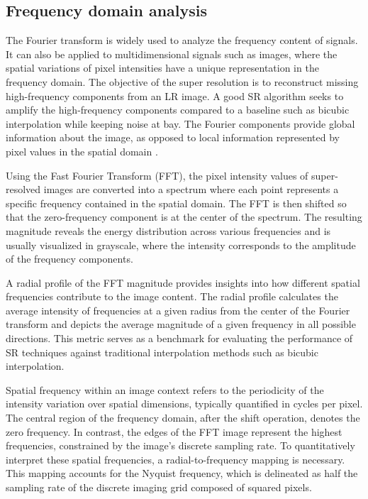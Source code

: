         \subsection{Frequency domain analysis} \label{subsubsec:frequency_domain_analysis}
        
        The Fourier transform is widely used to analyze the frequency content of signals.
        It can also be applied to multidimensional signals such as images, where the spatial variations of pixel intensities have a unique representation in the frequency domain. 
        The objective of the super resolution is to reconstruct missing high-frequency components from an LR image.
        A good SR algorithm seeks to amplify the high-frequency components compared to a baseline such as bicubic interpolation while keeping noise at bay.
        The Fourier components provide global information about the image, as opposed to local information represented by pixel values in the spatial domain \cite{fuoli2021fourier}. 
        
        Using the Fast Fourier Transform (FFT), the pixel intensity values of super-resolved images are converted into a spectrum where each point represents a specific frequency contained in the spatial domain.
        The FFT is then shifted so that the zero-frequency component is at the center of the spectrum. 
        The resulting magnitude reveals the energy distribution across various frequencies and is usually visualized in grayscale, where the intensity corresponds to the amplitude of the frequency components.
        
        A radial profile of the FFT magnitude provides insights into how different spatial frequencies contribute to the image content.
        The radial profile calculates the average intensity of frequencies at a given radius from the center of the Fourier transform and depicts the average magnitude of a given frequency in all possible directions. This metric serves as a benchmark for evaluating the performance of SR techniques against traditional interpolation methods such as bicubic interpolation.
        
        Spatial frequency within an image context refers to the periodicity of the intensity variation over spatial dimensions, typically quantified in cycles per pixel. The central region of the frequency domain, after the shift operation, denotes the zero frequency. In contrast, the edges of the FFT image represent the highest frequencies, constrained by the image's discrete sampling rate.
        To quantitatively interpret these spatial frequencies, a radial-to-frequency mapping is necessary. This mapping accounts for the Nyquist frequency, which is delineated as half the sampling rate of the discrete imaging grid composed of squared pixels.

